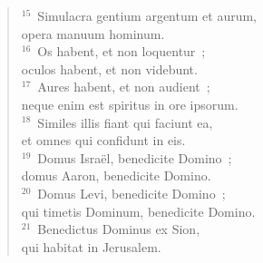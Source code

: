 \begin{flushleft}
\begin{verse}
${}^{15}$~Simulacra gentium argentum et aurum,\\ opera manuum hominum.\\
${}^{16}$~Os habent, et non loquentur~;\\ oculos habent, et non videbunt.\\
${}^{17}$~Aures habent, et non audient~;\\ neque enim est spiritus in ore ipsorum.\\
${}^{18}$~Similes illis fiant qui faciunt ea,\\ et omnes qui confidunt in eis.\\
${}^{19}$~Domus Isra\"el, benedicite Domino~;\\ domus Aaron, benedicite Domino.\\
${}^{20}$~Domus Levi, benedicite Domino~;\\ qui timetis Dominum, benedicite Domino.\\
${}^{21}$~Benedictus Dominus ex Sion,\\ qui habitat in Jerusalem.\end{verse}\end{flushleft}


